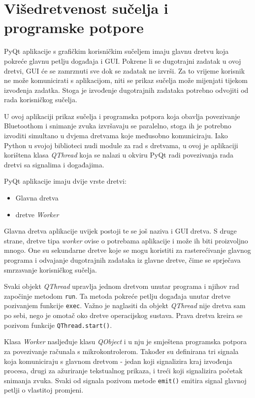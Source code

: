 \section{Višedretvenost sučelja i programske potpore}

PyQt aplikacije s grafičkim korisničkim sučeljem imaju glavnu dretvu koja pokreće glavnu petlju događaja i GUI. Pokrene li se dugotrajni zadatak u ovoj dretvi, GUI će se zamrznuti sve dok se zadatak ne izvrši. Za to vrijeme korisnik ne može komunicirati s aplikacijom, niti se prikaz sučelja može mijenjati tijekom izvođenja zadatka. Stoga je izvođenje dugotrajnih zadataka potrebno odvojiti od rada korisničkog sučelja.

U ovoj aplikaciji prikaz sučelja i programska potpora koja obavlja povezivanje Bluetoothom i snimanje zvuka izvršavaju se paralelno, stoga ih je potrebno izvoditi simultano u dvjema dretvama koje međusobno komuniciraju. Iako Python u svojoj biblioteci nudi module za rad s dretvama, u ovoj je aplikaciji korištena klasa \textit{Q\textit{}Thread} koja se nalazi u okviru PyQt radi povezivanja rada dretvi sa signalima i događajima.

PyQt aplikacije imaju dvije vrste dretvi:
\begin{itemize}
	\item Glavna dretva
	\item dretve \textit{Worker}
\end{itemize}

Glavna dretva aplikacije uvijek postoji te se još naziva i GUI dretva. S druge strane, dretve tipa \textit{worker} ovise o potrebama aplikacije i može ih biti proizvoljno mnogo. One su sekundarne dretve koje se mogu koristiti za rasterećivanje glavnog programa i odvajanje dugotrajnih zadataka iz glavne dretve, čime se sprječava smrzavanje korisničkog sučelja. 

Svaki objekt \textit{QThread} upravlja jednom dretvom unutar programa i njihov rad započinje metodom \lstinline|run|. Ta metoda pokreće petlju događaja unutar dretve pozivanjem funkcije \lstinline|exec|. Važno je naglasiti da objekt \textit{QThread} nije dretva sam po sebi, nego je omotač oko dretve operacijskog sustava. Prava dretva kreira se pozivom funkcije \lstinline|QThread.start()|.

Klasa \textit{Worker} nasljeđuje klasu \textit{QObject} i u nju je smještena programska potpora za povezivanje računala s mikrokontrolerom. Također su definirana tri signala koja komuniciraju s glavnom dretvom - jedan koji signalizira kraj izvođenja procesa, drugi za ažuriranje tekstualnog prikaza, i treći koji signalizira početak snimanja zvuka. Svaki od signala pozivom metode \lstinline|emit()| emitira signal glavnoj petlji o vlastitoj promjeni. 


